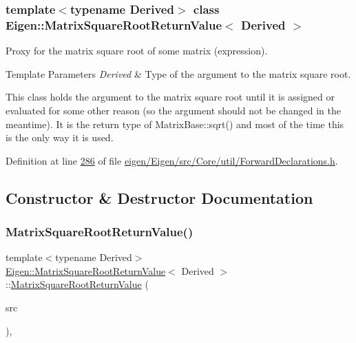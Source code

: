 \subsubsection*{template$<$typename Derived$>$\newline
class Eigen\+::\+Matrix\+Square\+Root\+Return\+Value$<$ Derived $>$}

Proxy for the matrix square root of some matrix (expression). 


\begin{DoxyTemplParams}{Template Parameters}
{\em Derived} & Type of the argument to the matrix square root.\\
\hline
\end{DoxyTemplParams}
This class holds the argument to the matrix square root until it is assigned or evaluated for some other reason (so the argument should not be changed in the meantime). It is the return type of Matrix\+Base\+::sqrt() and most of the time this is the only way it is used. 

Definition at line \hyperlink{eigen_2_eigen_2src_2_core_2util_2_forward_declarations_8h_source_l00286}{286} of file \hyperlink{eigen_2_eigen_2src_2_core_2util_2_forward_declarations_8h_source}{eigen/\+Eigen/src/\+Core/util/\+Forward\+Declarations.\+h}.



\subsection{Constructor \& Destructor Documentation}
\mbox{\label{class_eigen_1_1_matrix_square_root_return_value_aa27fd0e59ff1711a55ee8a4342c035d5}} 
\subsubsection{\texorpdfstring{Matrix\+Square\+Root\+Return\+Value()}{MatrixSquareRootReturnValue()}\hspace{0.1cm}{\footnotesize\ttfamily [1/2]}}
{\footnotesize\ttfamily template$<$typename Derived$>$ \\
\hyperlink{class_eigen_1_1_matrix_square_root_return_value}{Eigen\+::\+Matrix\+Square\+Root\+Return\+Value}$<$ Derived $>$\+::\hyperlink{class_eigen_1_1_matrix_square_root_return_value}{Matrix\+Square\+Root\+Return\+Value} (\begin{DoxyParamCaption}\item[{const Derived \&}]{src }\end{DoxyParamCaption})\hspace{0.3cm}{\ttfamily [inline]}, {\ttfamily [explicit]}}



